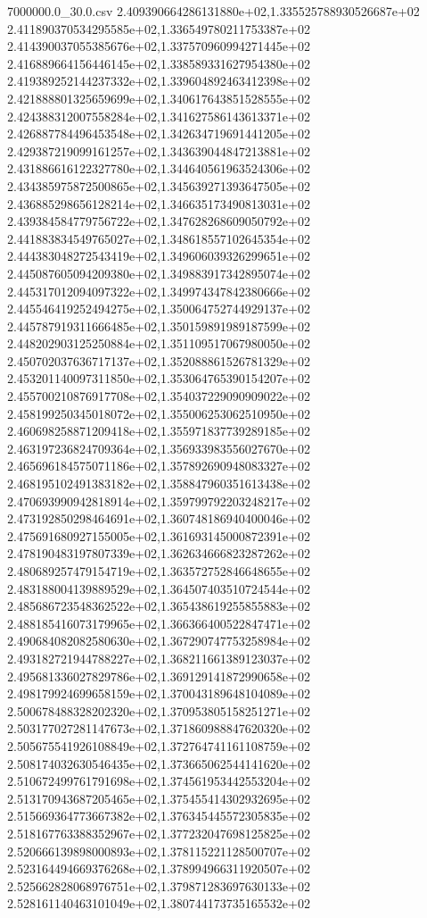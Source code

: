\begin{filecontents*}{7000000.0_30.0.csv}
2.409390664286131880e+02,1.335525788930526687e+02
2.411890370534295585e+02,1.336549780211753387e+02
2.414390037055385676e+02,1.337570960994271445e+02
2.416889664156446145e+02,1.338589331627954380e+02
2.419389252144237332e+02,1.339604892463412398e+02
2.421888801325659699e+02,1.340617643851528555e+02
2.424388312007558284e+02,1.341627586143613371e+02
2.426887784496453548e+02,1.342634719691441205e+02
2.429387219099161257e+02,1.343639044847213881e+02
2.431886616122327780e+02,1.344640561963524306e+02
2.434385975872500865e+02,1.345639271393647505e+02
2.436885298656128214e+02,1.346635173490813031e+02
2.439384584779756722e+02,1.347628268609050792e+02
2.441883834549765027e+02,1.348618557102645354e+02
2.444383048272543419e+02,1.349606039326299651e+02
2.445087605094209380e+02,1.349883917342895074e+02
2.445317012094097322e+02,1.349974347842380666e+02
2.445546419252494275e+02,1.350064752744929137e+02
2.445787919311666485e+02,1.350159891989187599e+02
2.448202903125250884e+02,1.351109517067980050e+02
2.450702037636717137e+02,1.352088861526781329e+02
2.453201140097311850e+02,1.353064765390154207e+02
2.455700210876917708e+02,1.354037229090909022e+02
2.458199250345018072e+02,1.355006253062510950e+02
2.460698258871209418e+02,1.355971837739289185e+02
2.463197236824709364e+02,1.356933983556027670e+02
2.465696184575071186e+02,1.357892690948083327e+02
2.468195102491383182e+02,1.358847960351613438e+02
2.470693990942818914e+02,1.359799792203248217e+02
2.473192850298464691e+02,1.360748186940400046e+02
2.475691680927155005e+02,1.361693145000872391e+02
2.478190483197807339e+02,1.362634666823287262e+02
2.480689257479154719e+02,1.363572752846648655e+02
2.483188004139889529e+02,1.364507403510724544e+02
2.485686723548362522e+02,1.365438619255855883e+02
2.488185416073179965e+02,1.366366400522847471e+02
2.490684082082580630e+02,1.367290747753258984e+02
2.493182721944788227e+02,1.368211661389123037e+02
2.495681336027829786e+02,1.369129141872990658e+02
2.498179924699658159e+02,1.370043189648104089e+02
2.500678488328202320e+02,1.370953805158251271e+02
2.503177027281147673e+02,1.371860988847620320e+02
2.505675541926108849e+02,1.372764741161108759e+02
2.508174032630546435e+02,1.373665062544141620e+02
2.510672499761791698e+02,1.374561953442553204e+02
2.513170943687205465e+02,1.375455414302932695e+02
2.515669364773667382e+02,1.376345445572305835e+02
2.518167763388352967e+02,1.377232047698125825e+02
2.520666139898000893e+02,1.378115221128500707e+02
2.523164494669376268e+02,1.378994966311920507e+02
2.525662828068976751e+02,1.379871283697630133e+02
2.528161140463101049e+02,1.380744173735165532e+02

\end{filecontents*}
